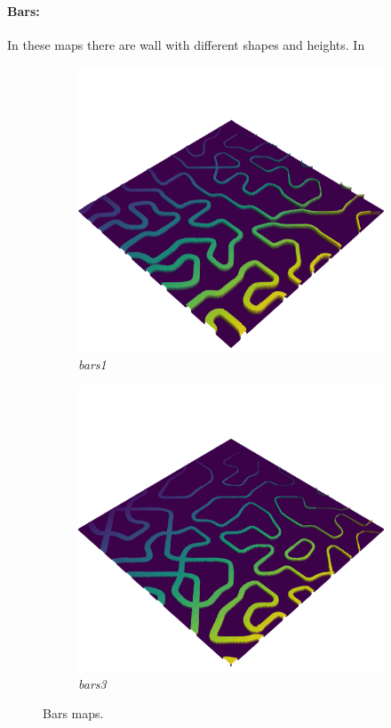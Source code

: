 \documentclass[../document.tex]{subfiles}
\begin{document}
\paragraph{Bars:} In these maps there are wall with different shapes and heights. In 
\begin{figure}[H]
    \centering
        \begin{subfigure}[b]{0.32\textwidth}
            \includegraphics[width=\textwidth]{../img/hm3d/bars1.png}
            \caption{\emph{bars1}}
        \end{subfigure}
        \begin{subfigure}[b]{0.32 \linewidth}
            \includegraphics[width=\textwidth]{../img/hm3d/bars3.png}
            \caption{\emph{bars3}}
            \end{subfigure}     
    \label{fig: heightmaps}
    \caption{Bars maps.}
\end{figure}
\end{document}
